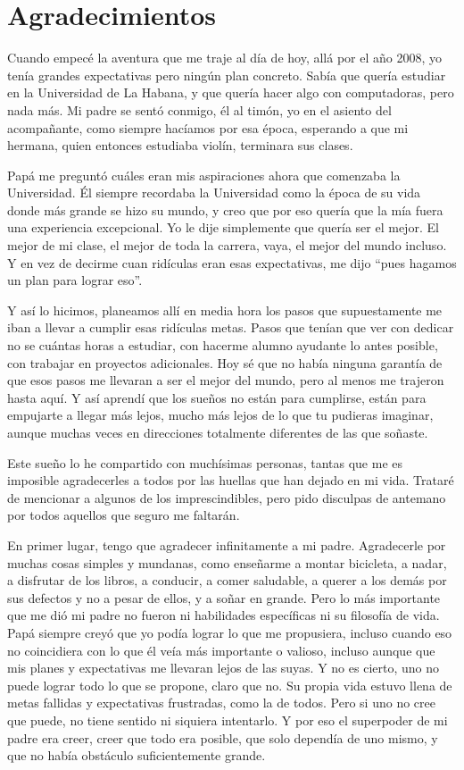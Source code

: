 \chapter*{Agradecimientos}
{}

Cuando empecé la aventura que me traje al día de hoy, allá por el año 2008, yo tenía grandes expectativas pero ningún plan concreto.
Sabía que quería estudiar en la Universidad de La Habana, y que quería hacer algo con computadoras, pero nada más.
Mi padre se sentó conmigo, él al timón, yo en el asiento del acompañante, como siempre hacíamos por esa época, esperando a que mi hermana, quien entonces estudiaba violín, terminara sus clases.

Papá me preguntó cuáles eran mis aspiraciones ahora que comenzaba la Universidad.
Él siempre recordaba la Universidad como la época de su vida donde más grande se hizo su mundo, y creo que por eso quería que la mía fuera una experiencia excepcional.
Yo le dije simplemente que quería ser el mejor. El mejor de mi clase, el mejor de toda la carrera, vaya, el mejor del mundo incluso.
Y en vez de decirme cuan ridículas eran esas expectativas, me dijo ``pues hagamos un plan para lograr eso''.

Y así lo hicimos, planeamos allí en media hora los pasos que supuestamente me iban a llevar a cumplir esas ridículas metas. Pasos que tenían que ver con dedicar no se cuántas horas a estudiar, con hacerme alumno ayudante lo antes posible, con trabajar en proyectos adicionales.
Hoy sé que no había ninguna garantía de que esos pasos me llevaran a ser el mejor del mundo, pero al menos me trajeron hasta aquí.
Y así aprendí que los sueños no están para cumplirse, están para empujarte a llegar más lejos, mucho más lejos de lo que tu pudieras imaginar, aunque muchas veces en direcciones totalmente diferentes de las que soñaste.

Este sueño lo he compartido con muchísimas personas, tantas que me es imposible agradecerles a todos por las huellas que han dejado en mi vida. Trataré de mencionar a algunos de los imprescindibles, pero pido disculpas de antemano por todos aquellos que seguro me faltarán.

En primer lugar, tengo que agradecer infinitamente a mi padre. Agradecerle por muchas cosas simples y mundanas, como enseñarme a montar bicicleta, a nadar, a disfrutar de los libros, a conducir, a comer saludable, a querer a los demás por sus defectos y no a pesar de ellos, y a soñar en grande.
Pero lo más importante que me dió mi padre no fueron ni habilidades específicas ni su filosofía de vida.
Papá siempre creyó que yo podía lograr lo que me propusiera, incluso cuando eso no coincidiera con lo que él veía más importante o valioso, incluso aunque que mis planes y expectativas me llevaran lejos de las suyas.
Y no es cierto, uno no puede lograr todo lo que se propone, claro que no.
Su propia vida estuvo llena de metas fallidas y expectativas frustradas, como la de todos.
Pero si uno no cree que puede, no tiene sentido ni siquiera intentarlo.
Y por eso el superpoder de mi padre era creer, creer que todo era posible, que solo dependía de uno mismo, y que no había obstáculo suficientemente grande.

